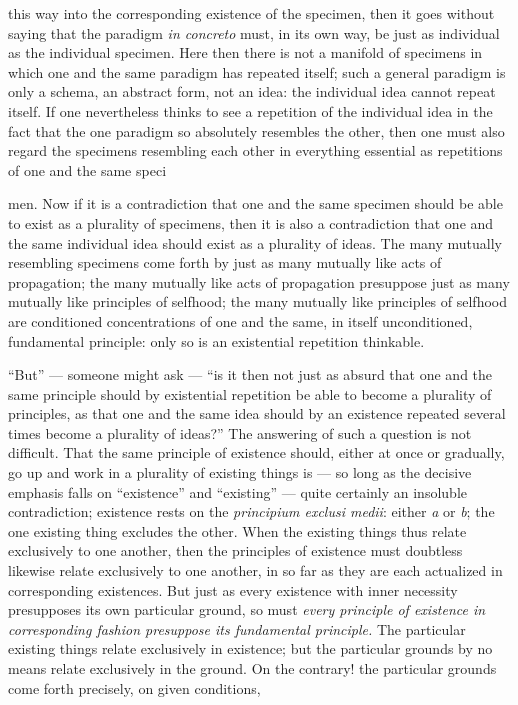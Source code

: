 \documentclass[12pt,a4paper]{book}
\begin{document}
this way into the corresponding existence of the specimen, then it goes without
saying that the paradigm \textit{in concreto} must, in its own way, be just as
individual as the individual specimen. Here then there is not a manifold of
specimens in which one and the same paradigm has repeated itself; such a general
paradigm is only a schema, an abstract form, not an idea: the individual idea
cannot repeat itself. If one nevertheless thinks to see a repetition of the
individual idea in the fact that the one paradigm so absolutely resembles the
other, then one must also regard the specimens resembling each other in everything
essential as repetitions of one and the same speci%

men. Now if it is a contradiction that one and the same specimen should be able to
exist as a plurality of specimens, then it is also a contradiction that one and the
same individual idea should exist as a plurality of ideas. The many mutually
resembling specimens come forth by just as many mutually like acts of propagation;
the many mutually like acts of propagation presuppose just as many mutually like
principles of selfhood; the many mutually like principles of selfhood are
conditioned concentrations of one and the same, in itself unconditioned,
fundamental principle: only so is an existential repetition thinkable.

``But'' --- someone might ask --- ``is it then not just as absurd that one and the
same principle should by existential repetition be able to become a plurality of
principles, as that one and the same idea should by an existence repeated several
times become a plurality of ideas?'' The answering of such a question is not
difficult. That the same principle of existence should, either at once or
gradually, go up and work in a plurality of existing things is --- so long as the
decisive emphasis falls on ``existence'' and ``existing'' --- quite certainly an
insoluble contradiction; existence rests on the \textit{principium exclusi medii}:
either \textit{a} or \textit{b}; the one existing thing excludes the other. When
the existing things thus relate exclusively to one another, then the principles of
existence must doubtless likewise relate exclusively to one another, in so far as
they are each actualized in corresponding existences. But just as every existence
with inner necessity presupposes its own particular ground, so must \emph{every
principle of existence in corresponding fashion presuppose its fundamental
principle.} The particular existing things relate exclusively in existence; but
the particular grounds by no means relate exclusively in the ground. On the
contrary! the particular grounds come forth precisely, on given conditions,
\end{document}
